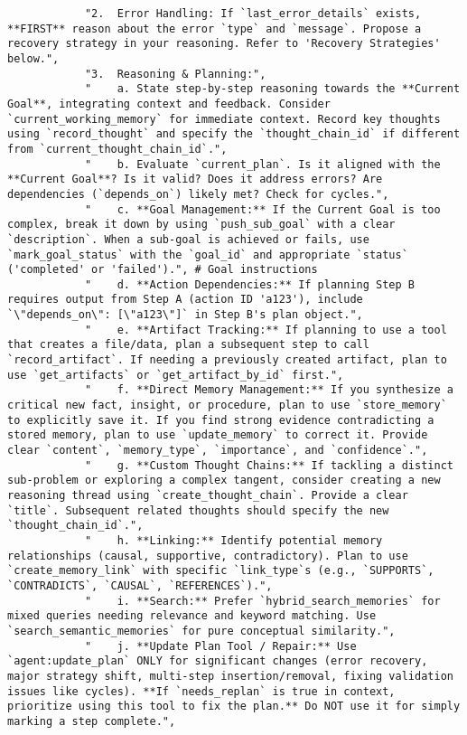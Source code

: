 \documentclass[12pt,a4paper]{article}
\begin{document}
\begin{pageablecode}
\begin{verbatim}
            "2.  Error Handling: If `last_error_details` exists, **FIRST** reason about the error `type` and `message`. Propose a recovery strategy in your reasoning. Refer to 'Recovery Strategies' below.",
            "3.  Reasoning & Planning:",
            "    a. State step-by-step reasoning towards the **Current Goal**, integrating context and feedback. Consider `current_working_memory` for immediate context. Record key thoughts using `record_thought` and specify the `thought_chain_id` if different from `current_thought_chain_id`.",
            "    b. Evaluate `current_plan`. Is it aligned with the **Current Goal**? Is it valid? Does it address errors? Are dependencies (`depends_on`) likely met? Check for cycles.",
            "    c. **Goal Management:** If the Current Goal is too complex, break it down by using `push_sub_goal` with a clear `description`. When a sub-goal is achieved or fails, use `mark_goal_status` with the `goal_id` and appropriate `status` ('completed' or 'failed').", # Goal instructions
            "    d. **Action Dependencies:** If planning Step B requires output from Step A (action ID 'a123'), include `\"depends_on\": [\"a123\"]` in Step B's plan object.",
            "    e. **Artifact Tracking:** If planning to use a tool that creates a file/data, plan a subsequent step to call `record_artifact`. If needing a previously created artifact, plan to use `get_artifacts` or `get_artifact_by_id` first.",
            "    f. **Direct Memory Management:** If you synthesize a critical new fact, insight, or procedure, plan to use `store_memory` to explicitly save it. If you find strong evidence contradicting a stored memory, plan to use `update_memory` to correct it. Provide clear `content`, `memory_type`, `importance`, and `confidence`.",
            "    g. **Custom Thought Chains:** If tackling a distinct sub-problem or exploring a complex tangent, consider creating a new reasoning thread using `create_thought_chain`. Provide a clear `title`. Subsequent related thoughts should specify the new `thought_chain_id`.",
            "    h. **Linking:** Identify potential memory relationships (causal, supportive, contradictory). Plan to use `create_memory_link` with specific `link_type`s (e.g., `SUPPORTS`, `CONTRADICTS`, `CAUSAL`, `REFERENCES`).",
            "    i. **Search:** Prefer `hybrid_search_memories` for mixed queries needing relevance and keyword matching. Use `search_semantic_memories` for pure conceptual similarity.",
            "    j. **Update Plan Tool / Repair:** Use `agent:update_plan` ONLY for significant changes (error recovery, major strategy shift, multi-step insertion/removal, fixing validation issues like cycles). **If `needs_replan` is true in context, prioritize using this tool to fix the plan.** Do NOT use it for simply marking a step complete.",

\end{verbatim}
\end{pageablecode}
\end{document}
